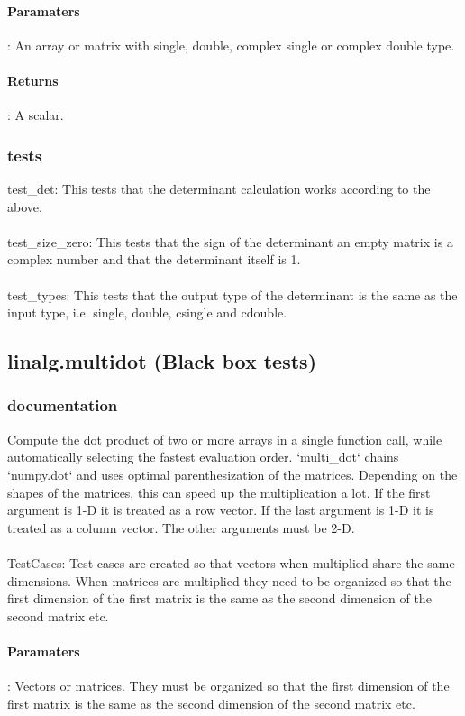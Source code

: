 \paragraph{Paramaters}: An array or matrix with single, double, complex single or complex double type. 
\paragraph{Returns}: A scalar. 
\subsubsection{tests}
test\_det: This tests that the determinant calculation works according to the above. \\
\\
test\_size\_zero: This tests that the sign of the determinant an empty matrix is a complex number and that the determinant itself is 1. \\
\\
test\_types: This tests that the output type of the determinant is the same as the input type, i.e. single, double, csingle and cdouble. 

\subsection{linalg.multidot (Black box tests)}
\subsubsection{documentation}
Compute the dot product of two or more arrays in a single function call, while automatically selecting the fastest evaluation order. `multi\_dot` chains `numpy.dot` and uses optimal parenthesization of the matrices. Depending on the shapes of the matrices, this can speed up the multiplication a lot. If the first argument is 1-D it is treated as a row vector. If the last argument is 1-D it is treated as a column vector. The other arguments must be 2-D.\\
\\
TestCases: Test cases are created so that vectors when multiplied share the same dimensions. When matrices are multiplied they need to be organized so that the first dimension of the first matrix is the same as the second dimension of the second matrix etc. 
\paragraph{Paramaters}: Vectors or matrices. They must be organized so that the first dimension of the first matrix is the same as the second dimension of the second matrix etc. 
